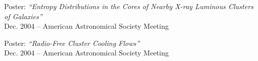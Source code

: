\documentclass[12pt]{cv}
\begin{document}
\begin{llist}
{\sc Poster: {\textit{``Entropy Distributions in the Cores of Nearby X-ray Luminous Clusters of Galaxies''}}}\\
Dec. 2004 -- American Astronomical Society Meeting

{\sc Poster: {\textit{``Radio-Free Cluster Cooling Flows''}}}\\
Dec. 2004 -- American Astronomical Society Meeting



\end{llist}
\end{document}
